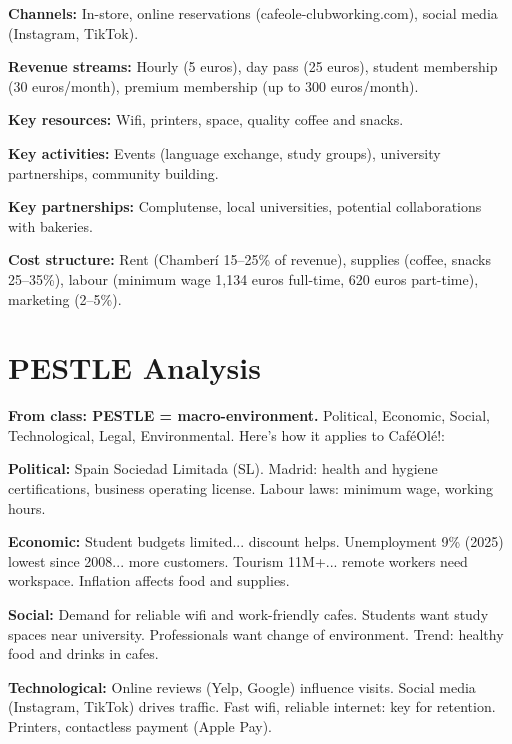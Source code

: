 \documentclass[12pt,a4paper]{article}
\begin{document}
\textbf{\textcolor{cafebrown}{Channels:}} In-store, online reservations (cafeole-clubworking.com), social media (Instagram, TikTok).

\textbf{\textcolor{cafebrown}{Revenue streams:}} Hourly (5 euros), day pass (25 euros), student membership (30 euros/month), premium membership (up to 300 euros/month).

\textbf{\textcolor{cafebrown}{Key resources:}} Wifi, printers, space, quality coffee and snacks.

\textbf{\textcolor{cafebrown}{Key activities:}} Events (language exchange, study groups), university partnerships, community building.

\textbf{\textcolor{cafebrown}{Key partnerships:}} Complutense, local universities, potential collaborations with bakeries.

\textbf{\textcolor{cafebrown}{Cost structure:}} Rent (Chamber\'i 15--25\% of revenue), supplies (coffee, snacks 25--35\%), labour (minimum wage 1,134 euros full-time, 620 euros part-time), marketing (2--5\%).

\vspace{0.5em}
\noindent{\color{sectionblue}\rule{\textwidth}{0.4pt}}

\section*{\color{sectionblue}PESTLE Analysis}\label{sec:pestle}

\textbf{From class: PESTLE = macro-environment.} Political, Economic, Social, Technological, Legal, Environmental. Here's how it applies to Caf\'eOl\'e!:

\textbf{\textcolor{cafebrown}{Political:}} Spain Sociedad Limitada (SL). Madrid: health and hygiene certifications, business operating license. Labour laws: minimum wage, working hours.

\textbf{\textcolor{cafebrown}{Economic:}} Student budgets limited... discount helps. Unemployment 9\% (2025) lowest since 2008... more customers. Tourism 11M+... remote workers need workspace. Inflation affects food and supplies.

\textbf{\textcolor{cafebrown}{Social:}} Demand for reliable wifi and work-friendly cafes. Students want study spaces near university. Professionals want change of environment. Trend: healthy food and drinks in cafes.

\textbf{\textcolor{cafebrown}{Technological:}} Online reviews (Yelp, Google) influence visits. Social media (Instagram, TikTok) drives traffic. Fast wifi, reliable internet: key for retention. Printers, contactless payment (Apple Pay).
\end{document}
